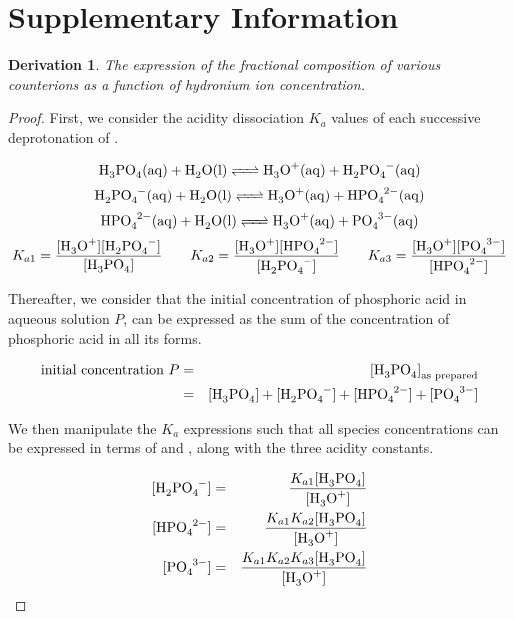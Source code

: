 \documentclass[10pt,twoside,a4paper]{article}
\newtheorem{thm}{Derivation}
\begin{document}
\setcounter{page}{11}
\section*{Supplementary Information}
     
    \begin{thm}The expression of the fractional composition of various counterions as a function of hydronium ion concentration.
    \end{thm}


	\begin{proof} First, we consider the acidity dissociation $K_a$ values of each successive deprotonation of .
	
		\begin{equation*}
 		\ce{H3PO4(aq) + H2O(l) <=> H3O+(aq) + H2PO4^-(aq)}
 		\end{equation*}
 		\begin{equation*}
 		\ce{H2PO4^-(aq) + H2O(l) <=> H3O+(aq) + HPO4^{2-}(aq)}
 		\end{equation*}
 		\begin{equation*}
 		\ce{HPO4^{2-}(aq) + H2O(l) <=> H3O+(aq) + PO4^{3-}(aq)}
 		\end{equation*}
 		\begin{equation*}
 		K_{a1}=\frac{\ce{[H3O+][H2PO4^-]}}{\ce{[H3PO4]}} \qquad K_{a2}=\frac{\ce{[H3O+][HPO4^{2-}]}}{\ce{[H2PO4^-]}}
 		\qquad K_{a3}=\frac{\ce{[H3O+][PO4^{3-}]}}{\ce{[HPO4^{2-}]}}
 		\end{equation*}
 		
 	Thereafter, we consider that the initial concentration of phosphoric acid in aqueous solution $P$, can be expressed as
 	the sum of the concentration of phosphoric acid in all its forms.
 		
 		\begin{eqnarray}
 		\text{initial concentration } P & = & \ce{[H3PO4]}_\text{as prepared} \nonumber \\ 
 		& = & \ce{[H3PO4] + [H2PO4^-] + [HPO4^{2-}] + [PO4^{3-}]} \nonumber 		
 		\end{eqnarray}
 		
 	We then manipulate the $K_a$ expressions such that all species concentrations can be expressed in terms of \ce{[H_3PO_4]} and \ce{[H3O+]}, along with the three acidity constants.
 	
 	\begin{eqnarray}
 		\ce{[H2PO4^{-}]} & = & \frac{K_{a1}\ce{[H3PO4]}}{\ce{[H3O+]}} \nonumber \\ 
 		\ce{[HPO4^{2-}]} & = & \frac{K_{a1}K_{a2}\ce{[H3PO4]}}{\ce{[H3O+]}} \nonumber \\
 		\ce{[PO4^{3-}]} & = & \frac{K_{a1}K_{a2}K_{a3}\ce{[H3PO4]}}{\ce{[H3O+]}} \nonumber		
 		\end{eqnarray}
 		

\end{proof}
\end{document}
